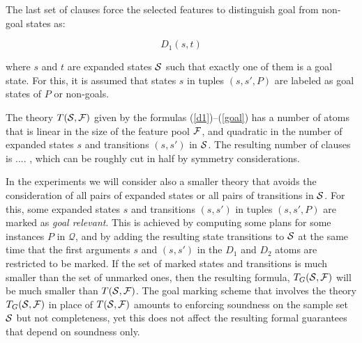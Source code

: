 \documentclass[letterpaper]{article} %
\newcommand{\Omit}[1]{}
\newcommand{\Q}{\mathcal{Q}}
\begin{document}
\Omit{ %
  Refer to this as an ``efficiency optimization'' ..
  
  such that $s < t$, and transition $(s,s')$ in ${\cal S}$. Due to the symmetry breaking caused by the constraint $s < t$,
  the following formulas are also needed

\begin{equation}
  \neg D_1(s, t) \, \Rightarrow \, \bigvee_{s'} \neg D_2(s, s', t, t')
    \label{bridge2}
\end{equation}

\noindent where the  iteration in the right hand disjunction goes over the different successor states $s'$ of the first argument
$s$ of $D_1$ that are in the sample set ${\cal S}$, $s$ and $t$ are states in ${\cal S}_1$ as before with $s < t$, and $t'$ is a
successor state of $t$ in ${\cal S}$; i.e. $(t,t') \in {\cal S}$.
}


The last  set of clauses force the selected features to distinguish goal from non-goal states as:

\begin{equation}
  D_1(s,t) 
\label{goal}
\end{equation}

\noindent where  $s$ and $t$  are expanded states  ${\cal S}$ such that exactly one of them is a goal state. 
For this, it is assumed that  states $s$ in   tuples $(s,s',P)$ are labeled as   goal states  of $P$ or non-goals.

The theory $T({\cal S},{\cal F})$ given by the formulas  (\ref{d1})--(\ref{goal})
has a number of atoms that is linear in the size of the feature pool $\cal F$,
and quadratic in the number of expanded  states $s$  and transitions $(s,s')$ in ${\cal S}$.
The resulting number of clauses is ....  , which can be roughly cut in half by  symmetry considerations.

In the experiments we will consider also a smaller theory  that avoids the consideration of all pairs
of expanded states or all pairs of transitions in $\cal S$. For this, some expanded states $s$ and transitions $(s,s')$ in
tuples $(s,s',P)$ are marked as \emph{goal relevant}. This is achieved by computing some plans for some instances $P$ in $\Q$, 
and by adding the resulting state transitions to ${\cal S}$ at the same time that the first
arguments $s$ and $(s,s')$ in the  $D_1$ and $D_2$ atoms are restricted to be marked.
If the set of marked states and transitions is much smaller than the set of unmarked ones, 
then the resulting formula,  $T_G({\cal S},{\cal F})$ will be much smaller than $T({\cal S},{\cal F})$.
The goal marking scheme that involves the theory $T_G({\cal S},{\cal F})$ in place of $T({\cal S},{\cal F})$
amounts to enforcing soundness on  the sample set ${\cal S}$ but not completeness, yet this does
not affect the resulting  formal guarantees that depend on soundness only. 
\end{document}
